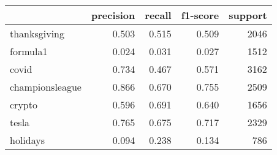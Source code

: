 \begin{tabular}{lrrrr}
\toprule
{} &  precision &  recall &  f1-score &  support \\
\midrule
thanksgiving    &      0.503 &   0.515 &     0.509 &     2046 \\
formula1        &      0.024 &   0.031 &     0.027 &     1512 \\
covid           &      0.734 &   0.467 &     0.571 &     3162 \\
championsleague &      0.866 &   0.670 &     0.755 &     2509 \\
crypto          &      0.596 &   0.691 &     0.640 &     1656 \\
tesla           &      0.765 &   0.675 &     0.717 &     2329 \\
holidays        &      0.094 &   0.238 &     0.134 &      786 \\
\bottomrule
\end{tabular}
